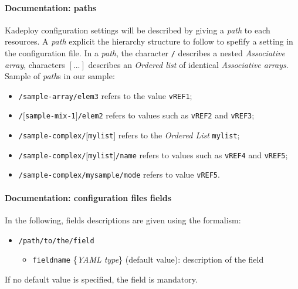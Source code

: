 \documentclass[a4wide,10pt,oneside]{book}
\newcommand{\ypath}[1]{\texttt{#1}}
\newcommand{\yfieldd}[3]{\texttt{#1} {\small\{{\emph{#2}}\}} {\small(}#3{\small)}:}
\begin{document}
\paragraph{Documentation: paths\\}
Kadeploy configuration settings will be described by giving a \emph{path} to each resources. A \emph{path} explicit the hierarchy structure to follow to spefify a setting in the configuration file. In a \emph{path}, the character \texttt{/} describes a nested \emph{Associative array}, characters \texttt{$[...]$} describes an \emph{Ordered list} of identical \emph{Associative arrays}.\\

Sample of \emph{path}s in our sample:
\begin{itemize}
  \item \texttt{\small /sample-array/elem3} refers to the value \texttt{\small vREF1};
  \item \texttt{\small /$[$sample-mix-1$]$/elem2} refers to values such as \texttt{\small vREF2} and \texttt{\small vREF3};
  \item \texttt{\small /sample-complex/$[$mylist$]$} refers to the \emph{Ordered List} \texttt{\small mylist};
  \item \texttt{\small /sample-complex/$[$mylist$]$/name} refers to values such as \texttt{\small vREF4} and \texttt{\small vREF5};
  \item \texttt{\small /sample-complex/mysample/mode} refers to value \texttt{\small vREF5}.
\end{itemize}

\paragraph{Documentation: configuration files fields\\}
In the following, fields descriptions are given using the formalism:
\begin{itemize}
  \item \ypath{/path/to/the/field}
  \begin{itemize}
    \item \yfieldd{fieldname}{YAML type}{default value} description of the field
  \end{itemize}
\end{itemize}
If no default value is specified, the field is mandatory.
\end{document}
